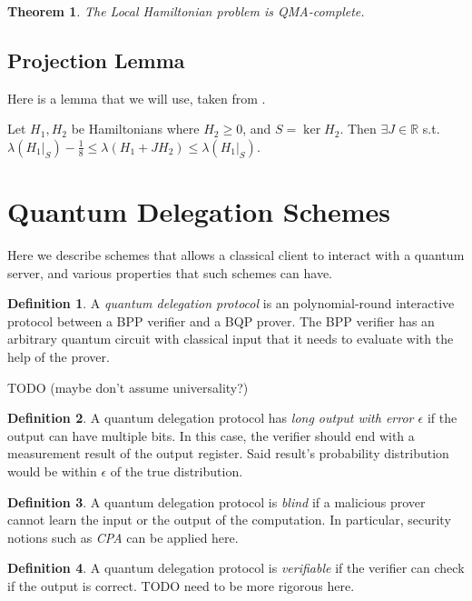 \documentclass{article}
\newtheorem{theorem}{Theorem}[section]
\theoremstyle{definition}
\newtheorem{definition}{Definition}[section]
\begin{document}
\begin{theorem}
	The Local Hamiltonian problem is QMA-complete.
\end{theorem}

\subsection{Projection Lemma}

Here is a lemma that we will use, taken from \cite{quant-ph/0406180}.

Let $H_1, H_2$ be Hamiltonians where $H_2\geq0$, and $S=\ker H_2$.
Then $\exists J\in\mathbb{R}$ s.t.
$\lambda(H_1\big|_S)-\frac{1}{8}\leq
	\lambda(H_1+JH_2)\leq\lambda(H_1\big|_S)$.

\section{Quantum Delegation Schemes}

Here we describe schemes that allows a classical client to interact with a quantum server, and various properties that such schemes can have.

\begin{definition}
	A \emph{quantum delegation protocol} is an polynomial-round interactive protocol between a BPP verifier and a BQP prover. The BPP verifier has an arbitrary quantum circuit with classical input that it needs to evaluate with the help of the prover.
\end{definition}

TODO (maybe don't assume universality?)

\begin{definition}
	A quantum delegation protocol has \emph{long output with error $\epsilon$} if the output can have multiple bits. In this case, the verifier should end with a measurement result of the output register. Said result's probability distribution would be within $\epsilon$ of the true distribution.
\end{definition}

\begin{definition}
	A quantum delegation protocol is \emph{blind} if a malicious prover cannot learn the input or the output of the computation. In particular, security notions such as \emph{CPA} can be applied here.
\end{definition}

\begin{definition}
	A quantum delegation protocol is \emph{verifiable} if the verifier can check if the output is correct. TODO need to be more rigorous here.
\end{definition}
\end{document}
